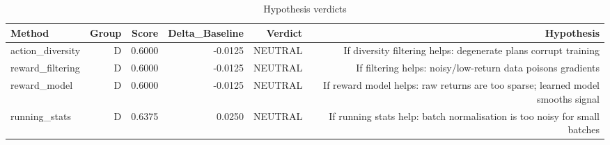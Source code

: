 \begin{table}[htbp]
\centering
\caption{Hypothesis verdicts}
\label{tab:hyp-verdicts}
\begin{tabular}{lrrrrr}
\toprule
\textbf{Method} & \textbf{Group} & \textbf{Score} & \textbf{Delta\_Baseline} & \textbf{Verdict} & \textbf{Hypothesis} \\
\midrule
action\_diversity & D & 0.6000 & -0.0125 & NEUTRAL & If diversity filtering helps: degenerate plans corrupt training \\
reward\_filtering & D & 0.6000 & -0.0125 & NEUTRAL & If filtering helps: noisy/low-return data poisons gradients \\
reward\_model & D & 0.6000 & -0.0125 & NEUTRAL & If reward model helps: raw returns are too sparse; learned model smooths signal \\
running\_stats & D & 0.6375 & 0.0250 & NEUTRAL & If running stats help: batch normalisation is too noisy for small batches \\
\bottomrule
\end{tabular}
\end{table}